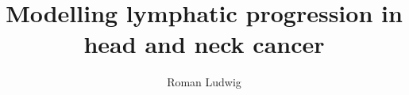 \documentclass[hyperpdf,bindnopdf]{hepthesis}
\title{Modelling lymphatic progression in head and neck cancer}
\author{Roman Ludwig}
\begin{document}
\begin{frontmatter}
    
\end{frontmatter}

\begin{mainmatter}
    
    
\end{mainmatter}

\begin{appendices}
    
\end{appendices}

\begin{backmatter}
    
\end{backmatter}

\end{document}
